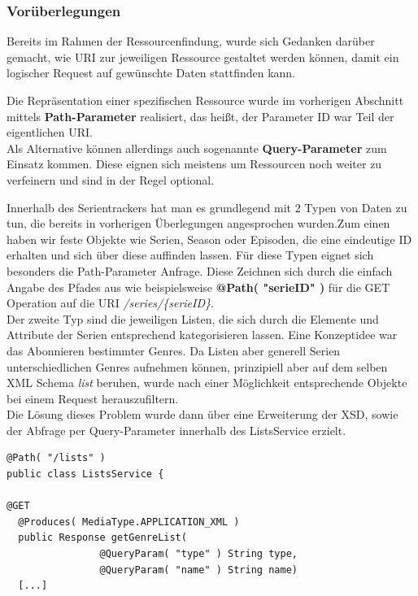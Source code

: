 \subsubsection{Vorüberlegungen}
Bereits im Rahmen der Ressourcenfindung, wurde sich Gedanken darüber gemacht, wie URI zur jeweiligen Ressource gestaltet werden können, damit ein logischer Request auf gewünschte Daten stattfinden kann.

Die Repräsentation einer spezifischen Ressource wurde im vorherigen Abschnitt mittels \textbf{Path-Parameter} realisiert, das heißt, der Parameter ID war Teil der eigentlichen URI.\\
Als Alternative können allerdings auch sogenannte \textbf{Query-Parameter} zum Einsatz kommen. Diese eignen sich meistens um Ressourcen noch weiter zu verfeinern und sind in der Regel optional.

Innerhalb des Serientrackers hat man es grundlegend mit 2 Typen von Daten zu tun, die bereits in vorherigen Überlegungen angesprochen wurden.Zum einen haben wir feste Objekte wie Serien, Season oder Episoden, die eine eindeutige ID erhalten und sich über diese auffinden lassen. Für diese Typen eignet sich besonders die Path-Parameter Anfrage.
Diese Zeichnen sich durch die einfach Angabe des Pfades aus wie beispielsweise \textbf{@Path( "{serieID}" )} für die GET Operation auf die URI \textit{/series/\{serieID\}}.\\
Der zweite Typ sind die jeweiligen Listen, die sich durch die Elemente und Attribute der Serien entsprechend kategorisieren lassen. Eine Konzeptidee war das Abonnieren bestimmter Genres. Da Listen aber generell Serien unterschiedlichen Genres aufnehmen können, prinzipiell aber auf dem selben XML Schema \textit{list} beruhen, wurde nach einer Möglichkeit entsprechende Objekte bei einem Request herauszufiltern.\\ Die Lösung dieses Problem wurde dann über eine Erweiterung der XSD, sowie der Abfrage per Query-Parameter innerhalb des ListsService erzielt.
\begin{lstlisting}[label=listsservice,caption= Auszug aus ListsService mit QueryParam]
@Path( "/lists" )
public class ListsService {

@GET
  @Produces( MediaType.APPLICATION_XML )
  public Response getGenreList(
                @QueryParam( "type" ) String type,
                @QueryParam( "name" ) String name)
  [...]
\end{lstlisting}

